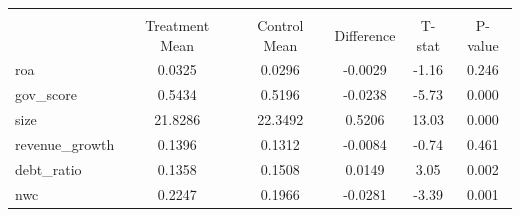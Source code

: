 {
\def\sym#1{\ifmmode^{#1}\else\(^{#1}\)\fi}
\begin{tabular}{l*{1}{ccccc}}
\hline\hline
                    &\multicolumn{5}{c}{}                                            \\
                    &Treatment Mean&Control Mean&  Difference&      T-stat&     P-value\\
\hline
roa                 &      0.0325&      0.0296&     -0.0029&       -1.16&       0.246\\
gov\_score           &      0.5434&      0.5196&     -0.0238&       -5.73&       0.000\\
size                &     21.8286&     22.3492&      0.5206&       13.03&       0.000\\
revenue\_growth      &      0.1396&      0.1312&     -0.0084&       -0.74&       0.461\\
debt\_ratio          &      0.1358&      0.1508&      0.0149&        3.05&       0.002\\
nwc                 &      0.2247&      0.1966&     -0.0281&       -3.39&       0.001\\
\hline\hline
\end{tabular}
}
